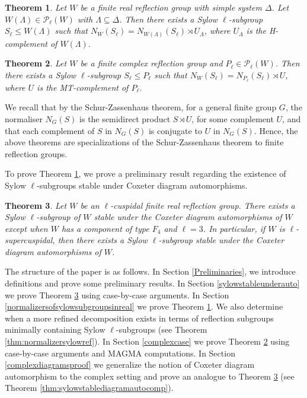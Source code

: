\documentclass[12pt]{amsart}
\theoremstyle{plain}
\newtheorem{theorem}{Theorem}[section]
\theoremstyle{definition}
\numberwithin{equation}{section}
\numberwithin{equation}{section}
\begin{document}
	\begin{theorem}\label{thm:normalizersylowreal}
		Let $W$ be a finite real reflection group with simple system $\Delta$. Let $W(\Lambda)\in \mathcal{P}_\ell(W)$ with $\Lambda\subseteq \Delta$. Then there exists a Sylow $\ell$-subgroup $S_\ell\leq W(\Lambda)$ such that $N_W(S_\ell)=N_{W(\Lambda)}(S_\ell)\rtimes U_\Lambda$, where $U_\Lambda$ is the H-complement of $W(\Lambda)$.
	\end{theorem}
	
	\begin{theorem}\label{thm:normalizersylowparacomp}
		Let $W$ be a finite complex reflection group and $P_\ell\in \mathcal{P}_\ell(W)$. Then there exists a Sylow $\ell$-subgroup $S_\ell\leq P_\ell$ such that $N_W(S_\ell)=N_{P_\ell}(S_\ell)\rtimes U$, where $U$ is the MT-complement of $P_\ell$.
	\end{theorem}
	
	We recall that by the Schur-Zassenhaus theorem, for a general finite group $G$, the normaliser $N_G(S)$ is the semidirect product $S\rtimes U$, for some complement $U$, and that each complement of $S$ in $N_G(S)$ is conjugate to $U$ in $N_G(S)$. Hence, the above theorems are specializations of the Schur-Zassenhaus theorem to finite reflection groups. 
	
	To prove Theorem \ref{thm:normalizersylowreal}, we prove a preliminary result regarding the existence of Sylow $\ell$-subgroups stable under Coxeter diagram automorphisms.
	
	\begin{theorem}\label{thm:sylowstablediagramautroeal}
		Let $W$ be an $\ell$-cuspidal finite real reflection group. There exists a Sylow $\ell$-subgroup of $W$ stable under the Coxeter diagram automorphisms of $W$ except when $W$ has a component of type $F_4$ and $\ell=3$. In particular, if $W$ is $\ell$-supercuspidal, then there exists a Sylow $\ell$-subgroup stable under the Coxeter diagram automorphisms of $W$.
	\end{theorem}
	
	The structure of the paper is as follows. In Section \ref{Preliminaries}, we introduce definitions and prove some preliminary results. In Section \ref{sylowstableunderauto} we prove Theorem \ref{thm:sylowstablediagramautroeal} using case-by-case arguments. In Section \ref{normalizersofsylowsubgroupsinreal} we prove Theorem \ref{thm:normalizersylowreal}. We also determine when a more refined decomposition exists in terms of reflection subgroups minimally containing Sylow $\ell$-subgroups (see Theorem \ref{thm:normalizersylowref}). In Section \ref{complexcase} we prove Theorem \ref{thm:normalizersylowparacomp} using case-by-case arguments and MAGMA \cite{MAGMA} computations. In Section \ref{complexdiagramsproof} we generalize the notion of Coxeter diagram automorphism to the complex setting and prove an analogue to Theorem \ref{thm:sylowstablediagramautroeal} (see Theorem \ref{thm:sylowstablediagramautocomp}). 
	
\end{document}
